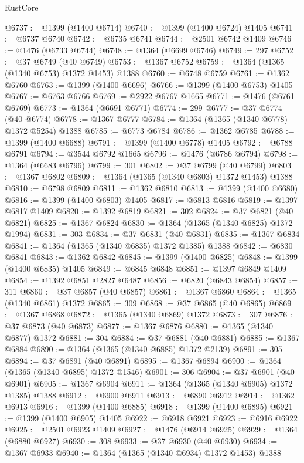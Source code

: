 \begin{lexlean}{RustCore}
\begin{coremodule}
@6737 := @1399 (@1400 @6714)
@6740 := @1399 (@1400 @6724) @1405
@6741 := @6737 @6740
@6742 := @6735 @6741
@6744 := @2501 @6742 @1409
@6746 := @1476 (@6733 @6744)
@6748 := @1364 (@6699 @6746)
@6749 := 297
@6752 := @37 @6749 (@40 @6749)
@6753 := @1367 @6752
@6759 := @1364 (@1365 (@1340 @6753) @1372 @1453) @1388
@6760 := @6748 @6759
@6761 := @1362 @6760
@6763 := @1399 (@1400 @6696)
@6766 := @1399 (@1400 @6753) @1405
@6767 := @6763 @6766
@6769 := @2922 @6767 @1665
@6771 := @1476 (@6761 @6769)
@6773 := @1364 (@6691 @6771)
@6774 := 299
@6777 := @37 @6774 (@40 @6774)
@6778 := @1367 @6777
@6784 := @1364 (@1365 (@1340 @6778) @1372 @5254) @1388
@6785 := @6773 @6784
@6786 := @1362 @6785
@6788 := @1399 (@1400 @6688)
@6791 := @1399 (@1400 @6778) @1405
@6792 := @6788 @6791
@6794 := @3544 @6792 @1665
@6796 := @1476 (@6786 @6794)
@6798 := @1364 (@6683 @6796)
@6799 := 301
@6802 := @37 @6799 (@40 @6799)
@6803 := @1367 @6802
@6809 := @1364 (@1365 (@1340 @6803) @1372 @1453) @1388
@6810 := @6798 @6809
@6811 := @1362 @6810
@6813 := @1399 (@1400 @6680)
@6816 := @1399 (@1400 @6803) @1405
@6817 := @6813 @6816
@6819 := @1397 @6817 @1409
@6820 := @1392 @6819
@6821 := 302
@6824 := @37 @6821 (@40 @6821)
@6825 := @1367 @6824
@6830 := @1364 (@1365 (@1340 @6825) @1372 @1994)
@6831 := 303
@6834 := @37 @6831 (@40 @6831)
@6835 := @1367 @6834
@6841 := @1364 (@1365 (@1340 @6835) @1372 @1385) @1388
@6842 := @6830 @6841
@6843 := @1362 @6842
@6845 := @1399 (@1400 @6825)
@6848 := @1399 (@1400 @6835) @1405
@6849 := @6845 @6848
@6851 := @1397 @6849 @1409
@6854 := @1392 @6851 @2827 @6487
@6856 := @6820 (@6843 @6854)
@6857 := 311
@6860 := @37 @6857 (@40 @6857)
@6861 := @1367 @6860
@6864 := @1365 (@1340 @6861) @1372
@6865 := 309
@6868 := @37 @6865 (@40 @6865)
@6869 := @1367 @6868
@6872 := @1365 (@1340 @6869) @1372
@6873 := 307
@6876 := @37 @6873 (@40 @6873)
@6877 := @1367 @6876
@6880 := @1365 (@1340 @6877) @1372
@6881 := 304
@6884 := @37 @6881 (@40 @6881)
@6885 := @1367 @6884
@6890 := @1364 (@1365 (@1340 @6885) @1372 @2139)
@6891 := 305
@6894 := @37 @6891 (@40 @6891)
@6895 := @1367 @6894
@6900 := @1364 (@1365 (@1340 @6895) @1372 @1546)
@6901 := 306
@6904 := @37 @6901 (@40 @6901)
@6905 := @1367 @6904
@6911 := @1364 (@1365 (@1340 @6905) @1372 @1385) @1388
@6912 := @6900 @6911
@6913 := @6890 @6912
@6914 := @1362 @6913
@6916 := @1399 (@1400 @6885)
@6918 := @1399 (@1400 @6895)
@6921 := @1399 (@1400 @6905) @1405
@6922 := @6918 @6921
@6923 := @6916 @6922
@6925 := @2501 @6923 @1409
@6927 := @1476 (@6914 @6925)
@6929 := @1364 (@6880 @6927)
@6930 := 308
@6933 := @37 @6930 (@40 @6930)
@6934 := @1367 @6933
@6940 := @1364 (@1365 (@1340 @6934) @1372 @1453) @1388

\end{coremodule}
\end{lexlean}
